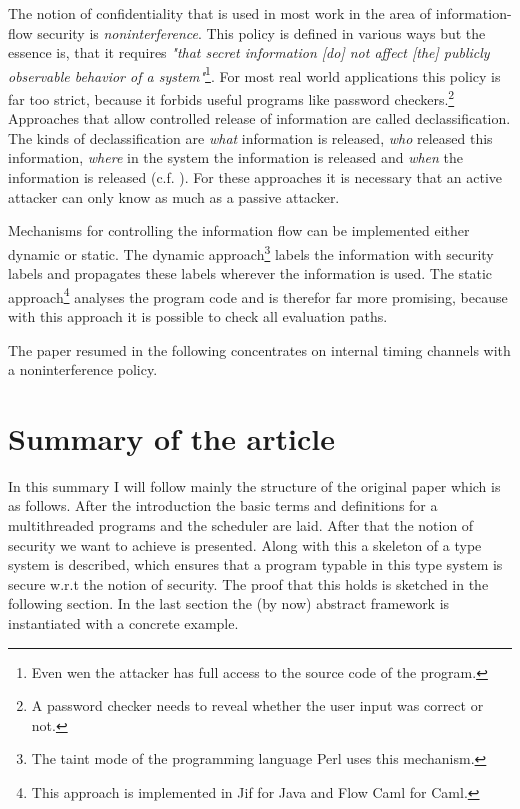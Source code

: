 \documentclass[a4paper,10pt]{llncs}
\begin{document}
The notion of confidentiality that is used in most work in the area of information-flow security is \textit{noninterference}.
This policy is defined in various ways but the essence is, that it requires \textit{"that secret information
[do] not affect [the] publicly observable behavior of a system"}\footnote{Even wen the attacker has full access to the
source code of the program.}\cite{Zdancewic04}. For most real world
applications this policy is far too strict, because it forbids useful programs like password checkers.\footnote{A
password checker needs to reveal whether the user input was correct or not.} Approaches that allow
controlled release of information are called declassification. The kinds of declassification are \textit{what}
information is released, \textit{who} released this information, \textit{where} in the system the information
is released and \textit{when} the information is released (c.f. \cite{Sabelfeld05}). For these approaches it is necessary that an
active attacker can only know as much as a passive attacker.

Mechanisms for controlling the information flow can be implemented either dynamic or static. The dynamic approach\footnote{
The taint mode of the programming language Perl uses this mechanism.}
labels the information with security labels and propagates these labels wherever the information is used. The static
approach\footnote{This approach is implemented in Jif for Java and Flow Caml for Caml.} analyses the program code and is
therefor far more promising, because with this approach it is possible to check all evaluation paths.

The paper resumed in the following concentrates on internal timing channels with a noninterference policy.

\section{Summary of the article}
\label{sec:discussion}
In this summary I will follow mainly the structure of the original
paper \cite{Barthe07} which is as follows. After the introduction the basic
terms and definitions for a multithreaded programs and the scheduler are
laid. After that the notion of security we want to achieve is presented.
Along with this a skeleton of a type system is described, which ensures
that a program typable in this type system is secure w.r.t the notion of
security. The proof that this holds is sketched in the following section.
In the last section the (by now) abstract framework is instantiated with a
concrete example.
\end{document}
